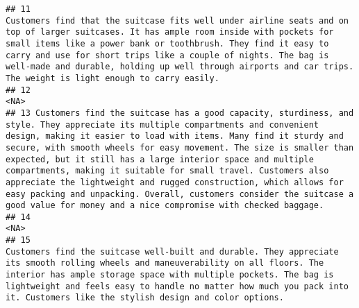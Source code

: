 \documentclass[
]{article}
\begin{document}
\begin{verbatim}
## 11                                                                                                                                                                                                                            Customers find that the suitcase fits well under airline seats and on top of larger suitcases. It has ample room inside with pockets for small items like a power bank or toothbrush. They find it easy to carry and use for short trips like a couple of nights. The bag is well-made and durable, holding up well through airports and car trips. The weight is light enough to carry easily.
## 12                                                                                                                                                                                                                                                                                                                                                                                                                                                                                                                                                                                                                       <NA>
## 13 Customers find the suitcase has a good capacity, sturdiness, and style. They appreciate its multiple compartments and convenient design, making it easier to load with items. Many find it sturdy and secure, with smooth wheels for easy movement. The size is smaller than expected, but it still has a large interior space and multiple compartments, making it suitable for small travel. Customers also appreciate the lightweight and rugged construction, which allows for easy packing and unpacking. Overall, customers consider the suitcase a good value for money and a nice compromise with checked baggage.
## 14                                                                                                                                                                                                                                                                                                                                                                                                                                                                                                                                                                                                                       <NA>
## 15                                                                                                                                                                                                                                                                                     Customers find the suitcase well-built and durable. They appreciate its smooth rolling wheels and maneuverability on all floors. The interior has ample storage space with multiple pockets. The bag is lightweight and feels easy to handle no matter how much you pack into it. Customers like the stylish design and color options.

\end{verbatim}
\end{document}
